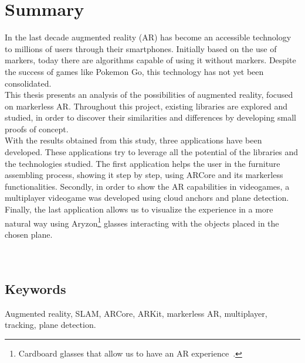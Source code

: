 \newpage
\chapter*{Summary}
In the last decade augmented reality (AR) has become an accessible technology to millions of users through their smartphones. Initially based on the use of markers, today there are algorithms capable of using it without markers. Despite the success of games like Pokemon Go, this technology has not yet been consolidated.\\

This thesis presents an analysis of the possibilities of augmented reality, focused on markerless AR. Throughout this project, existing libraries are explored and studied, in order to discover their similarities and differences by developing small proofs of concept.\\ 

With the results obtained from this study, three applications have been developed. These applications try to leverage all the potential of the libraries and the technologies studied. The first application helps the user in the furniture assembling process, showing it step by step, using ARCore and its markerless functionalities. Secondly, in order to show the AR capabilities in videogames, a multiplayer videogame was developed using cloud anchors and plane detection.
Finally, the last application allows us to visualize the experience in a more natural way using Aryzon\footnote{Cardboard glasses that allow us to have an AR experience~\cite{Aryzon}.} glasses interacting with the objects placed in the chosen plane.
\\
\\
\\

\section*{Keywords}
Augmented reality, SLAM, ARCore, ARKit, markerless AR, multiplayer, tracking, plane detection.
\noindent
\noindent

